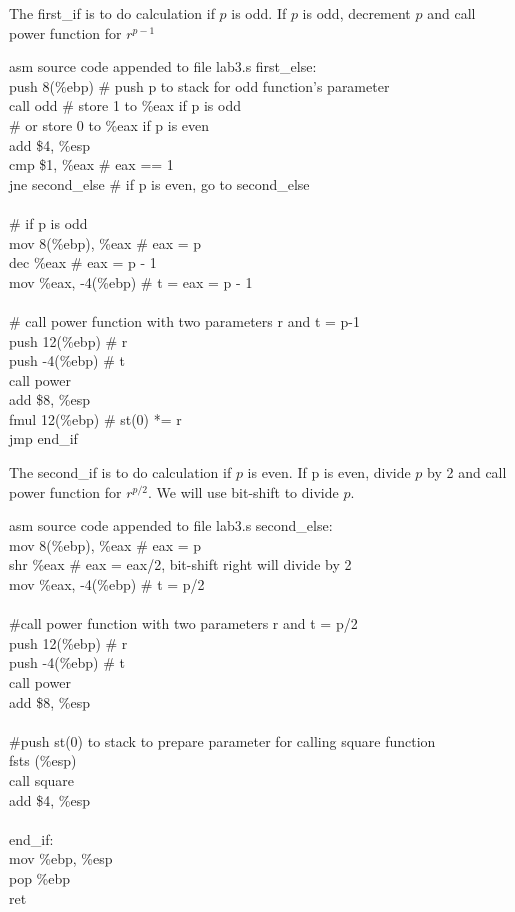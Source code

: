 \documentclass{article}
\begin{document}
The first\_if is to do calculation if $p$ is odd. If $p$ is odd, decrement $p$ and call power function for $r^{p-1}$
\begin{GFT}{asm source code appended to file lab3.s}
\+first\_else:\\
\+  push 8(\%ebp)			\# push p to stack for odd function's parameter\\
\+  call odd			\# store 1 to \%eax if p is odd\\
\+				\# or store 0 to \%eax if p is even \\
\+  add \$4, \%esp\\
\+  cmp \$1, \%eax			\# eax == 1\\
\+  jne second\_else		\# if p is even, go to second\_else \\
\+\\
\+  \# if p is odd\\
\+  mov 8(\%ebp), \%eax		\# eax = p\\
\+  dec \%eax			\# eax = p - 1\\
\+  mov \%eax, -4(\%ebp)		\# t = eax = p - 1\\
\+\\
\+  \# call power function with two parameters r and t = p-1\\
\+  push 12(\%ebp)			\# r\\
\+  push -4(\%ebp)			\# t\\
\+  call power\\
\+  add \$8, \%esp\\
\+  fmul 12(\%ebp)			\# st(0) *= r\\
\+  jmp end\_if\\
\end{GFT}
The second\_if is to do calculation if $p$ is even. If p is even, divide $p$ by 2 and call power function for $r^{p/2}$. We will use bit-shift to divide $p$.
\begin{GFT}{asm source code appended to file lab3.s}
\+second\_else:\\
\+  mov 8(\%ebp), \%eax		\# eax = p\\
\+  shr \%eax			\# eax = eax/2, bit-shift right will divide by 2\\
\+  mov \%eax, -4(\%ebp)		\# t = p/2\\
\+\\
\+  \#call power function with two parameters r and t = p/2\\
\+  push 12(\%ebp)			\# r\\
\+  push -4(\%ebp)			\# t\\
\+  call power\\
\+  add \$8, \%esp\\
\+\\
\+  \#push st(0) to stack to prepare parameter for calling square function\\
\+  fsts (\%esp)\\
\+  call square\\
\+  add \$4, \%esp \\
\+\\
\+end\_if:\\
\+  mov \%ebp, \%esp\\
\+  pop \%ebp\\
\+  ret\\
\+  \\
\end{GFT}
\end{document}
